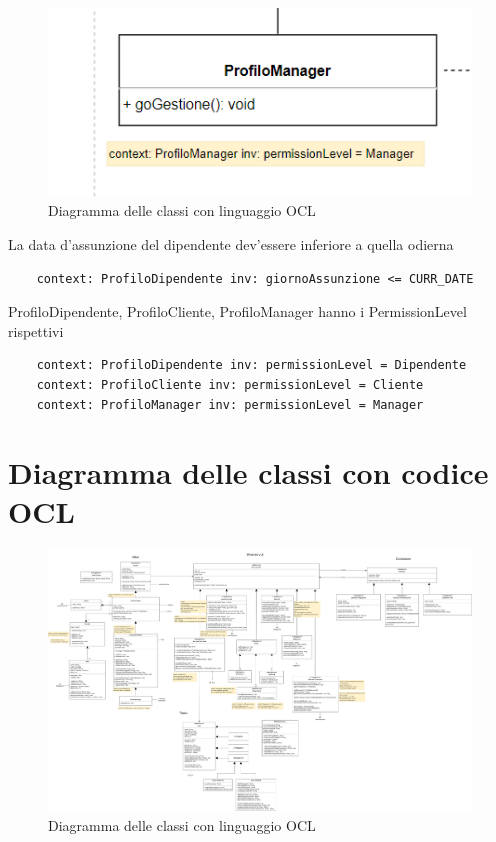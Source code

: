 \documentclass{report}
\begin{document}
\begin{figure}[H]
	\centering\includegraphics[width=1\textwidth]{images/OCL/OCL_manager.png}
	Diagramma delle classi con linguaggio OCL 
\end{figure}
La data d'assunzione del dipendente dev'essere inferiore a quella odierna
\begin{verbatim}
	context: ProfiloDipendente inv: giornoAssunzione <= CURR_DATE
\end{verbatim}
ProfiloDipendente, ProfiloCliente, ProfiloManager hanno i PermissionLevel rispettivi
\begin{verbatim}
	context: ProfiloDipendente inv: permissionLevel = Dipendente
	context: ProfiloCliente inv: permissionLevel = Cliente
	context: ProfiloManager inv: permissionLevel = Manager
\end{verbatim}

\chapter{Diagramma delle classi con codice OCL}
\begin{figure}[H]
	\centering\includegraphics[width=1\textwidth]{images/Diagramma_delle_classi_OCL.png}
	Diagramma delle classi con linguaggio OCL 
\end{figure}
\end{document}

